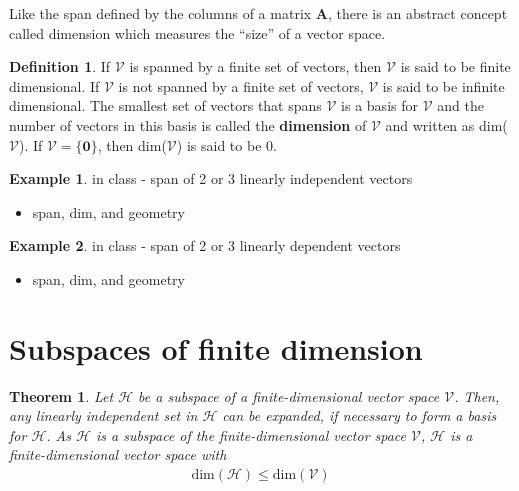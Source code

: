 \documentclass[
]{book}
\providecommand{\tightlist}{%
  \setlength{\itemsep}{0pt}\setlength{\parskip}{0pt}}
\newtheorem{theorem}{Theorem}[chapter]
\theoremstyle{definition}
\newtheorem{definition}{Definition}[chapter]
\theoremstyle{definition}
\newtheorem{example}{Example}[chapter]
\theoremstyle{definition}
\theoremstyle{definition}
\theoremstyle{remark}
\begin{document}
Like the span defined by the columns of a matrix \(\mathbf{A}\), there is an abstract concept called dimension which measures the ``size'' of a vector space.

\begin{definition}
If \({\mathcal{V}}\) is spanned by a finite set of vectors, then \({\mathcal{V}}\) is said to be finite dimensional. If \({\mathcal{V}}\) is not spanned by a finite set of vectors, \({\mathcal{V}}\) is said to be infinite dimensional. The smallest set of vectors that spans \({\mathcal{V}}\) is a basis for \({\mathcal{V}}\) and the number of vectors in this basis is called the \textbf{dimension} of \({\mathcal{V}}\) and written as dim(\({\mathcal{V}}\)). If \({\mathcal{V}}= \{\mathbf{0}\}\), then dim(\({\mathcal{V}}\)) is said to be 0.
\end{definition}

\begin{example}

in class - span of 2 or 3 linearly independent vectors

\begin{itemize}
\tightlist
\item
  span, dim, and geometry
\end{itemize}

\end{example}

\begin{example}

in class - span of 2 or 3 linearly dependent vectors

\begin{itemize}
\tightlist
\item
  span, dim, and geometry
\end{itemize}

\end{example}

\hypertarget{subspaces-of-finite-dimension}{%
\section{Subspaces of finite dimension}\label{subspaces-of-finite-dimension}}

\begin{theorem}
Let \(\mathcal{H}\) be a subspace of a finite-dimensional vector space \({\mathcal{V}}\). Then, any linearly independent set in \(\mathcal{H}\) can be expanded, if necessary to form a basis for \(\mathcal{H}\). As \(\mathcal{H}\) is a subspace of the finite-dimensional vector space \({\mathcal{V}}\), \(\mathcal{H}\) is a finite-dimensional vector space with
\[
\begin{aligned}
\mbox{dim}(\mathcal{H}) \leq \mbox{dim}(\mathcal{V})
\end{aligned}
\]
\end{theorem}
\end{document}
